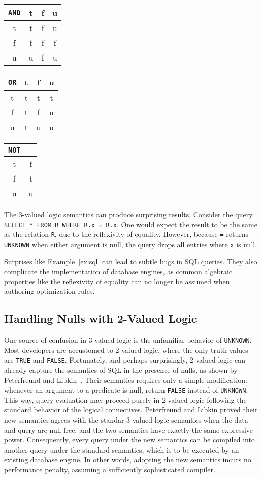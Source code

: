 \documentclass[sigconf,nonacm]{acmart}
\begin{document}
\begin{tabular}{ c|ccc } 
  \lstinline|AND| & t & f & u \\ 
  \hline
  t & t & f & u \\
  f & f & f & f \\
  u & u & f & u
\end{tabular}\qquad
%
\begin{tabular}{ c|ccc } 
  \lstinline|OR| & t & f & u \\ 
  \hline
  t & t & t & t \\
  f & t & f & u \\
  u & t & u & u
\end{tabular}\qquad
%
\begin{tabular}{ c|c } 
  \lstinline|NOT| &  \\ 
  \hline
  t & f \\
  f & t \\
  u & u 
\end{tabular}\quad

\begin{example}
\label{ex:sql}
The 3-valued logic semantics can produce surprising results.
Consider the query \lstinline|SELECT * FROM R WHERE R.x = R.x|.
One would expect the result to be the same as the relation \lstinline|R|,
 due to the reflexivity of equality.
However, because \lstinline|=| returns \lstinline|UNKNOWN| 
 when either argument is null,
 the query drops all entries 
 where \lstinline|x| is null.
\end{example}

Surprises like Example~\ref{ex:sql} 
 can lead to subtle bugs in SQL queries. 
They also complicate the implementation of database engines, 
 as common algebraic properties like the reflexivity of equality
 can no longer be assumed when authoring optimization rules.

\subsection{Handling Nulls with 2-Valued Logic}

One source of confusion in 3-valued logic
 is the unfamiliar behavior of \lstinline|UNKNOWN|.
Most developers are accustomed to 2-valued logic,
 where the only truth values are \lstinline|TRUE| and \lstinline|FALSE|.
Fortunately, and perhaps surprisingly,
 2-valued logic can already capture the semantics of SQL 
 in the presence of nulls, 
 as shown by Peterfreund and Libkin~\cite{DBLP:conf/pods/LibkinP23}.
Their semantics requires only a simple modification:
 whenever an argument to a predicate is null,
 return \lstinline|FALSE| instead of \lstinline|UNKNOWN|.
This way, query evaluation may proceed purely in 2-valued logic
 following the standard behavior of the logical connectives.
Peterfreund and Libkin proved their new semantics 
 agrees with the standar 3-valued logic semantics
 when the data and query are null-free,
 and the two semantics have exactly the same expressive power.
Consequently, every query under the new semantics
 can be compiled into another query under the standard semantics,
 which is to be executed by an existing database engine.
In other words, adopting the new semantics 
 incurs no performance penalty,
 assuming a sufficiently sophisticated compiler.
\end{document}
